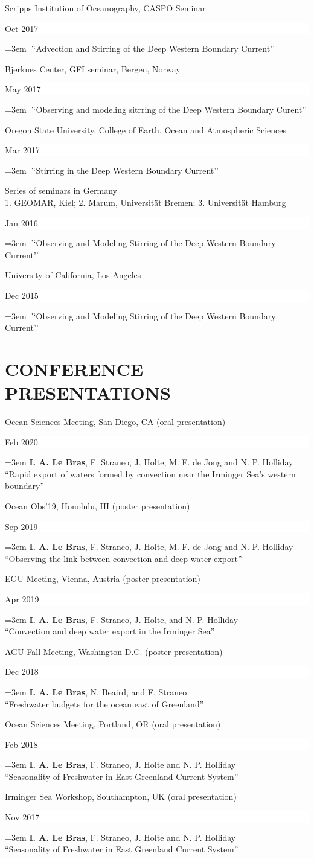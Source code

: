 \documentclass[paper=letter,fontsize=11pt]{scrartcl} %
\newcommand{\sepspace}{\vspace*{3mm}}		%
\newcommand{\NewPart}[2]{\section*{\uppercase{#1} #2}}
\newcommand{\TalkEntry}[3]{
		\noindent #1 \hfill      %
		\colorbox{White}{%
			\parbox{6em}{%
			\hfill\color{Black}#2}} \par  %
		\noindent\hangindent=3em\hangafter=0 \textit ``#3''\sepspace} %
\newcommand{\ConfEntry}[5]{
		\noindent #1 (#2) \hfill      %
		\colorbox{White}{%
			\parbox{6em}{%
			\hfill\color{Black}#3}} \par %
		\noindent \hangindent=3em\hangafter=0 #4 ``#5'' \sepspace}
\begin{document}
\TalkEntry{Scripps Institution of Oceanography, CASPO Seminar}{Oct 2017}{Advection and Stirring of the Deep Western Boundary Current}

\TalkEntry{Bjerknes Center, GFI seminar, Bergen, Norway}{May 2017}{Observing and modeling sitrring of the Deep Western Boundary Curent}

\TalkEntry{Oregon State University, College of Earth, Ocean and Atmospheric Sciences}{Mar 2017}{Stirring in the Deep Western Boundary Current}

\TalkEntry{Series of seminars in Germany \\ 1. GEOMAR, Kiel; 2. Marum, Universit\"at Bremen; 3. Universit\"at Hamburg}{Jan 2016}{Observing and Modeling Stirring of the Deep Western Boundary Current}

\TalkEntry{University of California, Los Angeles}{Dec 2015}{Observing and Modeling Stirring of the Deep Western Boundary Current}

\NewPart{Conference presentations}{}

\ConfEntry{Ocean Sciences Meeting, San Diego, CA}{oral presentation}{Feb 2020}{\textbf{I. A. Le Bras}, F. Straneo, J. Holte, M. F. de Jong and N. P. Holliday\\}{Rapid export of waters formed by convection near the Irminger Sea's western boundary}


\ConfEntry{Ocean Obs'19, Honolulu, HI}{poster presentation}{Sep 2019}{\textbf{I. A. Le Bras}, F. Straneo, J. Holte, M. F. de Jong and N. P. Holliday\\}{Observing the link between convection and deep water export}

\ConfEntry{EGU Meeting, Vienna, Austria}{poster presentation}{Apr 2019}{\textbf{I. A. Le Bras}, F. Straneo, J. Holte, and N. P. Holliday\\}{Convection and deep water export in the Irminger Sea}

\ConfEntry{AGU Fall Meeting, Washington D.C.}{poster presentation}{Dec 2018}{\textbf{I. A. Le Bras}, N. Beaird, and F. Straneo\\}{Freshwater budgets for the ocean east of Greenland}

\ConfEntry{Ocean Sciences Meeting, Portland, OR}{oral presentation}{Feb 2018}{\textbf{I. A. Le Bras}, F. Straneo, J. Holte and N. P. Holliday\\}{Seasonality of Freshwater in East Greenland Current System}

\ConfEntry{Irminger Sea Workshop, Southampton, UK}{oral presentation}{Nov 2017}{\textbf{I. A. Le Bras}, F. Straneo, J. Holte and N. P. Holliday\\}{Seasonality of Freshwater in East Greenland Current System}
\end{document}
